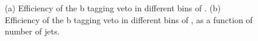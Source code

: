 \begin{figure}[htb]
\centering
\caption{(a) Efficiency of the b tagging veto in different bins of \pth. (b) Efficiency of the b tagging veto in different bins of \pth, as a function of number of jets.}\label{fig:bveto_eff}
\end{figure}

